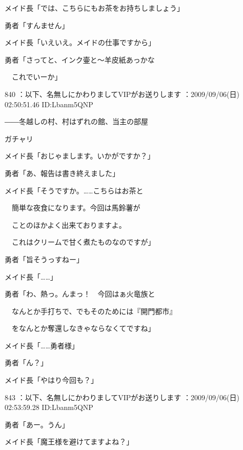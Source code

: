 \documentclass[a4j,twocolumn]{tarticle}
\begin{document}
メイド長「では、こちらにもお茶をお持ちしましょう」\par{} 
勇者「すんません」 



メイド長「いえいえ。メイドの仕事ですから」 



勇者「さってと、インク壷と～羊皮紙あっかな\par{}
　これでいーか」 

	

	

840 ：以下、名無しにかわりましてVIPがお送りします ：2009/09/06(日) 02:50:51.46 ID:Lbanm5QNP 


――冬越しの村、村はずれの館、当主の部屋 



ガチャリ 



メイド長「おじゃまします。いかがですか？」 



勇者「あ、報告は書き終えました」 



メイド長「そうですか。……こちらはお茶と\par{} 
　簡単な夜食になります。今回は馬鈴薯が\par{} 
　ことのほかよく出来ておりますよ。\par{} 
　これはクリームで甘く煮たものなのですが」 



勇者「旨そうっすねー」 



メイド長「……」 



勇者「わ、熱っ。んまっ！　今回はぁ火竜族と\par{} 
　なんとか手打ちで、でもそのためには『開門都市』\par{} 
　をなんとか奪還しなきゃならなくてですね」 



メイド長「……勇者様」 



勇者「ん？」 



メイド長「やはり今回も？」 

	
    
    

843 ：以下、名無しにかわりましてVIPがお送りします ：2009/09/06(日) 02:53:59.28 ID:Lbanm5QNP 


勇者「あー。うん」\par{} 
メイド長「魔王様を避けてますよね？」 
\end{document}
